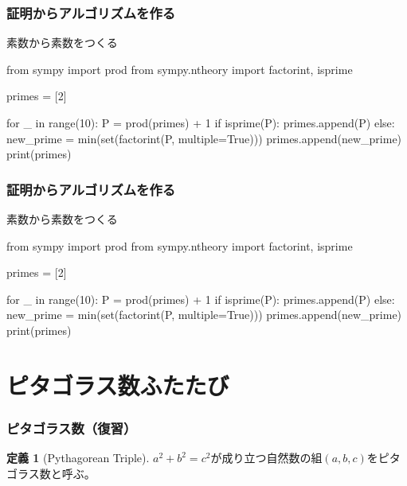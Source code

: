\documentclass[dvipdfmx,11pt,notheorems]{beamer}
\theoremstyle{definition}
\newtheorem{definition}{定義}
\begin{document}
\begin{frame}[fragile]\frametitle{証明からアルゴリズムを作る}

\begin{block}{素数から素数をつくる}
\begin{pyverbatim}
from sympy import prod
from sympy.ntheory import factorint, isprime

primes = [2]

for _ in range(10):
    P = prod(primes) + 1
    if isprime(P):
        primes.append(P)
    else:
        new_prime = min(set(factorint(P, multiple=True)))
        primes.append(new_prime)
print(primes)
\end{pyverbatim}
\end{block}

\end{frame}

\begin{frame}[fragile]\frametitle{証明からアルゴリズムを作る}

\begin{block}{素数から素数をつくる}
\begin{pycode}
from sympy import prod
from sympy.ntheory import factorint, isprime

primes = [2]

for _ in range(10):
    P = prod(primes) + 1
    if isprime(P):
        primes.append(P)
    else:
        new_prime = min(set(factorint(P, multiple=True)))
        primes.append(new_prime)
print(primes)
\end{pycode}
\end{block}

\end{frame}



\section{ピタゴラス数ふたたび}

\begin{frame}\frametitle{ピタゴラス数（復習）}

\begin{definition}[Pythagorean Triple]
$a^{2} + b^{2} = c^{2}$が成り立つ自然数の組$(a, b, c)$をピタゴラス数と呼ぶ。
\end{definition}

\end{frame}

\end{document}
